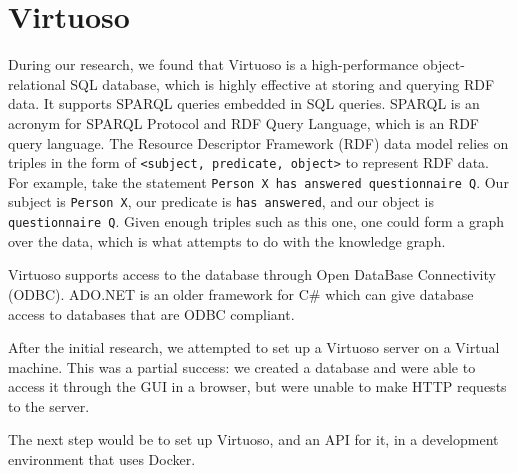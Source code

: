 \section{Virtuoso}
During our research, we found that Virtuoso is a high-performance object-relational SQL database, which is highly effective at storing and querying RDF data. It supports SPARQL queries embedded in SQL queries. SPARQL is an acronym for SPARQL Protocol and RDF Query Language, which is an RDF query language.
The Resource Descriptor Framework (RDF) data model relies on triples in the form of \texttt{<subject, predicate, object>} to represent RDF data\cite{ResourceDescriptionFramework2021}. For example, take the statement \texttt{Person X has answered questionnaire Q}. Our subject is \texttt{Person X}, our predicate is \texttt{has answered}, and our object is \texttt{questionnaire Q}. Given enough triples such as this one, one could form a graph over the data, which is what \knox{} attempts to do with the knowledge graph.


Virtuoso supports access to the database through Open DataBase Connectivity (ODBC).
ADO.NET is an older framework for C\# which can give database access to databases that are ODBC compliant.


After the initial research, we attempted to set up a Virtuoso server on a Virtual machine. This was a partial success: we created a database and were able to access it through the GUI in a browser, but were unable to make HTTP requests to the server.

The next step would be to set up Virtuoso, and an API for it, in a development environment that uses Docker.